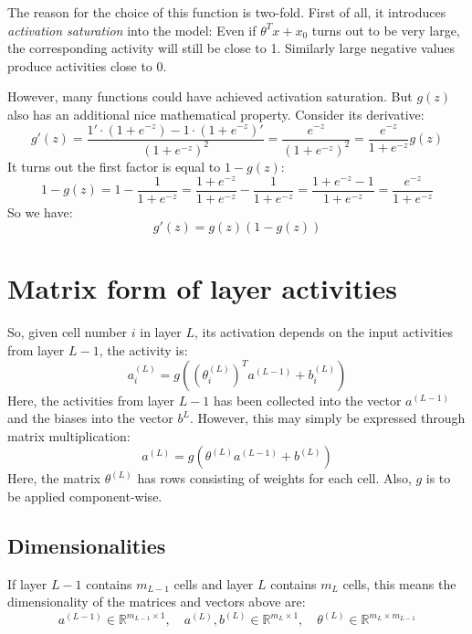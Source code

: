 \documentclass[12pt, a4paper]{article}
\numberwithin{equation}{section}
\begin{document}
The reason for the choice of this function is two-fold. First of all, it introduces \textit{activation saturation} into the model: Even if $\theta^T x+x_0$ turns out to be very large, the corresponding activity will still be close to 1. Similarly large negative values produce activities close to 0.

However, many functions could have achieved activation saturation. But $g(z)$ also has an additional nice mathematical property. Consider its derivative:
\begin{equation}
g'(z)=\frac{1'\cdot(1+e^{-z})-1\cdot(1+e^{-z})'}{(1+e^{-z})^2}=\frac{e^{-z}}{(1+e^{-z})^2}=\frac{e^{-z}}{1+e^{-z}}g(z)
\end{equation}
It turns out the first factor is equal to $1-g(z)$:
\begin{equation}
1-g(z)=1-\frac{1}{1+e^{-z}}=\frac{1+e^{-z}}{1+e^{-z}}-\frac{1}{1+e^{-z}}=\frac{1+e^{-z}-1}{1+e^{-z}}=\frac{e^{-z}}{1+e^{-z}}
\end{equation}
So we have:
\begin{equation}
\label{sigmoid_derivative}
g'(z)=g(z)\left(1-g(z)\right)
\end{equation}

\section{Matrix form of layer activities}
So, given cell number $i$ in layer $L$, its activation depends on the input activities from layer $L-1$, the activity is:
\begin{equation}
\label{layer_activity}
a^{(L)}_i=g\left(\left(\theta^{(L)}_i\right)^T a^{(L-1)} + b_i^{(L)}\right)
\end{equation}
Here, the activities from layer $L-1$ has been collected into the vector $a^{(L-1)}$ and the biases into the vector $b^{L}$. However, this may simply be expressed through matrix multiplication:
\begin{equation}
a^{(L)}=g\left(\theta^{(L)}a^{(L-1)}+b^{(L)}\right)
\end{equation}
Here, the matrix $\theta^{(L)}$ has rows consisting of weights for each cell. Also, $g$ is to be applied component-wise.

\subsection{Dimensionalities}
If layer $L-1$ contains $m_{L-1}$ cells and layer $L$ contains $m_L$ cells, this means the dimensionality of the matrices and vectors above are:
\begin{equation}
a^{(L-1)}\in\mathbb{R}^{m_{L-1}\times 1},\quad a^{(L)}, b^{(L)}\in\mathbb{R}^{m_L\times 1},\quad\theta^{(L)}\in\mathbb{R}^{m_L\times m_{L-1}} 
\end{equation}
\end{document}
